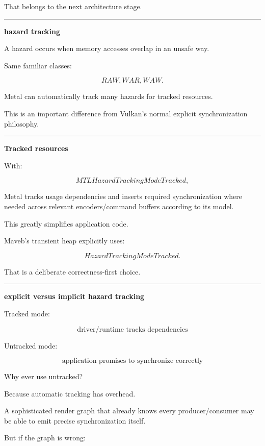 That belongs to the next architecture stage.

\begin{center}\rule{0.5\linewidth}{0.5pt}\end{center}

\textbf{hazard tracking}

A hazard occurs when memory accesses overlap in an unsafe way.

Same familiar classes:

\[
RAW,
WAR,
WAW.
\]

Metal can automatically track many hazards for tracked resources.

This is an important difference from Vulkan's normal explicit synchronization philosophy.

\begin{center}\rule{0.5\linewidth}{0.5pt}\end{center}

\textbf{Tracked resources}

With:

\[
MTLHazardTrackingModeTracked,
\]

Metal tracks usage dependencies and inserts required synchronization where needed across relevant encoders/command buffers according to its model.

This greatly simplifies application code.

Maveb's transient heap explicitly uses:

\[
\boxed{HazardTrackingModeTracked}.
\]

That is a deliberate correctness-first choice.

\begin{center}\rule{0.5\linewidth}{0.5pt}\end{center}

\textbf{explicit versus implicit hazard tracking}

Tracked mode:

\[
\boxed{
\text{driver/runtime tracks dependencies}
}
\]

Untracked mode:

\[
\boxed{
\text{application promises to synchronize correctly}
}
\]

Why ever use untracked?

Because automatic tracking has overhead.

A sophisticated render graph that already knows every producer/consumer may be able to emit precise synchronization itself.

But if the graph is wrong:

